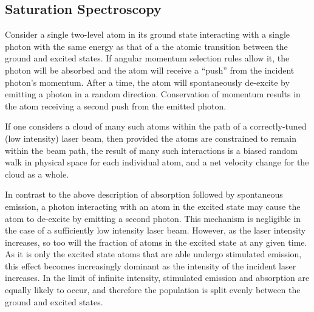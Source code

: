 \subsection{Saturation Spectroscopy}


Consider a single two-level atom in its ground state interacting with a single photon with the same energy as that of a the atomic transition between the ground and excited states.  If angular momentum selection rules allow it, the photon will be absorbed and the atom will receive a ``push'' 
from the incident 
%
%
photon's momentum.  
After a time, the atom will spontaneously de-excite by emitting a photon in a random direction.  Conservation of momentum results in the atom receiving a second push from the emitted photon.  

If one considers a cloud of many such atoms within the path of a correctly-tuned (low intensity) laser beam, then provided the atoms are constrained to remain within the beam path, the result of many such interactions is a biased random walk in physical space for each individual atom, and a net velocity change for the cloud as a whole.

In contrast to the above description of absorption followed by spontaneous emission, a photon interacting with an atom in the excited state may cause the atom to de-excite by emitting a second photon.  This mechanism is negligible in the case of a sufficiently low intensity laser beam.  However, as the laser intensity increases, so too will the fraction of atoms in the excited state at any given time.  As it is only the excited state atoms that are able undergo stimulated emission, this effect becomes increasingly dominant as the intensity of the incident laser increases.  In the limit of infinite intensity, stimulated emission and absorption are equally likely to occur, and therefore the population is split evenly between the ground and excited states.  

